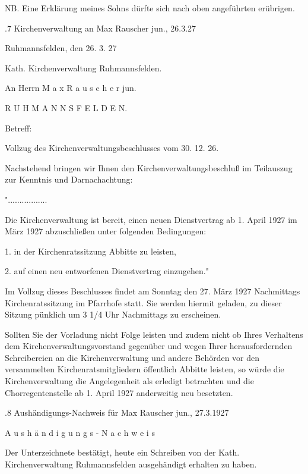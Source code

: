 NB. Eine Erklärung meines Sohns dürfte sich nach oben angeführten erübrigen.

.7 Kirchenverwaltung an Max Rauscher jun., 26.3.27

Ruhmannsfelden, den 26. 3. 27

Kath. Kirchenverwaltung Ruhmannsfelden.



An Herrn   M a x   R a u s c h e r   jun.



R U H M A N N S F E L D E N.



Betreff:



Vollzug des Kirchenverwaltungsbeschlusses vom 30. 12. 26.



Nachstehend bringen wir Ihnen den Kirchenverwaltungsbeschluß im Teilauszug zur
Kenntnis und Darnachachtung:



".................

Die Kirchenverwaltung ist bereit, einen neuen Dienstvertrag ab 1. April 1927 im
März 1927 abzuschließen unter folgenden Bedingungen:

1. in der Kirchenratssitzung Abbitte zu leisten,

2. auf einen neu entworfenen Dienstvertrag einzugehen."

Im Vollzug dieses Beschlusses findet am Sonntag den 27. März 1927 Nachmittags
Kirchenratssitzung im Pfarrhofe statt. Sie werden hiermit geladen, zu dieser
Sitzung pünklich um 3 1/4 Uhr Nachmittags zu erscheinen.

Sollten Sie der Vorladung nicht Folge leisten und zudem nicht ob Ihres
Verhaltens dem Kirchenverwaltungsvorstand gegenüber und wegen Ihrer
herausfordernden Schreibereien an die Kirchenverwaltung und andere Behörden vor
den versammelten Kirchenratsmitgliedern öffentlich Abbitte leisten, so würde die
Kirchenverwaltung die Angelegenheit als erledigt betrachten und die
Chorregentenstelle ab 1. April 1927 anderweitig neu besetzten.



.8 Aushändigungs-Nachweis für Max Rauscher jun., 27.3.1927

A u s h ä n d i g u n g s - N a c h w e i s



Der Unterzeichnete bestätigt, heute ein Schreiben von der Kath.
Kirchenverwaltung Ruhmannsfelden ausgehändigt erhalten zu haben.



